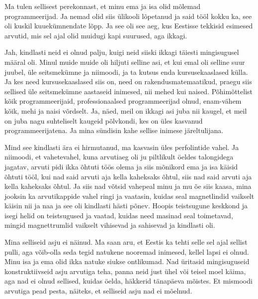 Ma tulen sellisest perekonnast, et minu ema ja isa olid mõlemad 
programmeerijad. Ja nemad olid siis ülikooli lõpetanud ja  said tööl kokku ka, 
see oli kuskil kuuekümnendate lõpp. Ja see oli see aeg, kus Eestisse tekkisid 
esimesed arvutid, mis sel ajal olid muidugi kapi suurused, aga ikkagi.


Jah, kindlasti neid ei olnud palju, kuigi neid siiski ikkagi täiesti 
mingisugusel määral oli. Minul muide muide oli hiljuti selline asi, et kui emal 
oli selline suur juubel, üle seitsmekümne ja niimoodi, ja ta kutsus enda 
kursusekaaslased külla. Ja kes need kursusekaaslased siis on, need on 
rakendusmatemaatikud, praegu siis sellised üle seitsmekümne aastaseid  
inimesed, nii mehed kui naised. Põhimõttelist kõik programmeerijaid, 
professionaalsed programmeerijad olnud, enam-vähem kõik, mehi ja naisi 
võrdselt. Ja, näed, meil on ikkagi asi juba nii kaugel, et meil on juba nagu 
suhteliselt kaugeid põlvkondi, kes on üles kasvanud programmeerijatena. Ja mina 
sündisin kahe sellise inimese järeltulijana.


Mind see kindlasti ära ei hirmutanud, ma kasvasin üles perfolintide vahel. Ja 
niimoodi, et vahetevahel, kuna arvutiaeg oli ju piltlikult öeldes talongidega 
jagatav, arvuti pidi ikka õhtuti töös olema ja siis mõnikord  ema ja isa käisid 
õhtuti tööl, kui nad said arvuti aja kella kaheksaks õhtul, siis nad said 
arvuti aja kella kaheksaks õhtul. Ja siis nad võtsid vahepeal minu ja mu õe 
siis kaasa, mina jooksin ka arvutikappide vahel ringi ja vaatasin, kuidas seal 
magnetlindid vaikselt käisin nii ja naa ja see oli kindlasti hästi põnev. 
Hoopis teistsugune keskkond ja isegi helid on teistsugused ja vaatad, kuidas 
need masinad seal toimetavad, mingid magnettrumlid vaikselt vihisevad ja 
sahisevad ja kindlasti oli.


Mina selliseid asju ei näinud. Ma saan aru, et Eestis ka tehti selle sel ajal 
sellist  pulli, aga võib-olla  seda tegid natukene nooremad inimesed, kellel 
lapsi ei olnud. Minu isa ja ema olid ikka natuke siukse ontlikumad. Nad 
üritasid mingisuguseid konstruktiivseid asju arvutiga teha,  panna neid just 
ühel või teisel moel  käima, aga nad ei olnud sellised, kuidas öelda, häkkerid 
tänapäeva mõistes. Et  mismoodi arvutiga  pead pesta, näiteks, et selliseid 
asju nad ei mõelnud.

